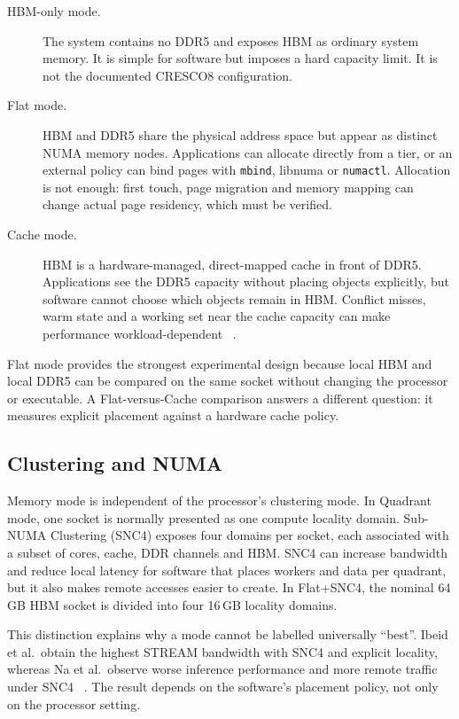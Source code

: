 \begin{description}
  \item[HBM-only mode.] The system contains no DDR5 and exposes HBM as
  ordinary system memory.  It is simple for software but imposes a hard
  capacity limit.  It is not the documented CRESCO8 configuration.

  \item[Flat mode.] HBM and DDR5 share the physical address space but
  appear as distinct NUMA memory nodes.  Applications can allocate
  directly from a tier, or an external policy can bind pages with
  \texttt{mbind}, libnuma or \texttt{numactl}.  Allocation is not enough:
  first touch, page migration and memory mapping can change actual page
  residency, which must be verified.

  \item[Cache mode.] HBM is a hardware-managed, direct-mapped cache in
  front of DDR5.  Applications see the DDR5 capacity without placing
  objects explicitly, but software cannot choose which objects remain
  in HBM.  Conflict misses, warm state and a working set near the cache
  capacity can make performance workload-dependent
  ~\cite{ibeid2025aurora}.
\end{description}

Flat mode provides the strongest experimental design because local HBM
and local DDR5 can be compared on the same socket without changing the
processor or executable.  A Flat-versus-Cache comparison answers a
different question: it measures explicit placement against a hardware
cache policy.

\subsection{Clustering and NUMA}

Memory mode is independent of the processor's clustering mode.  In
Quadrant mode, one socket is normally presented as one compute locality
domain.  Sub-NUMA Clustering (SNC4) exposes four domains per socket,
each associated with a subset of cores, cache, DDR channels and HBM.
SNC4 can increase bandwidth and reduce local latency for software that
places workers and data per quadrant, but it also makes remote accesses
easier to create.  In Flat+SNC4, the nominal 64\,GB HBM socket is divided
into four 16\,GB locality domains.

This distinction explains why a mode cannot be labelled universally
``best''.  Ibeid et al.\ obtain the highest STREAM bandwidth with SNC4
and explicit locality, whereas Na et al.\ observe worse inference
performance and more remote traffic under SNC4
~\cite{ibeid2025aurora,na2024llmcpu}.  The result depends on the
software's placement policy, not only on the processor setting.

